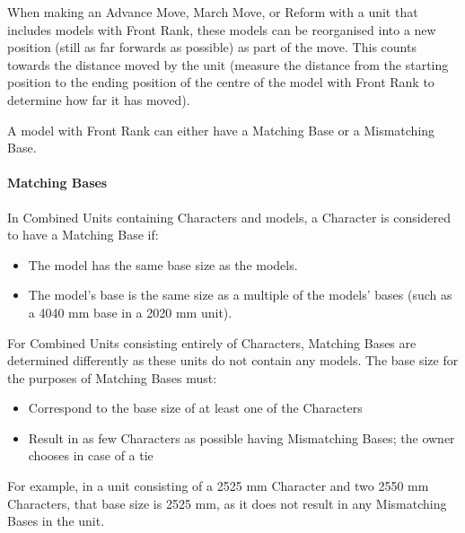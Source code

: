 When making an Advance Move, March Move, or Reform with a unit that includes models with Front Rank, these models can be reorganised into a new position (still as far forwards as possible) as part of the move. This counts towards the distance moved by the unit (measure the distance from the starting position to the ending position of the centre of the model with Front Rank to determine how far it has moved).

A model with Front Rank can either have a Matching Base or a Mismatching Base.

\paragraph{Matching Bases}
\label{matching_bases}

In Combined Units containing Characters and \rnf{} models, a Character is considered to have a Matching Base if:

\begin{itemize}
\item The model has the same base size as the \rnf{} models.
\item The model's base is the same size as a multiple of the \rnf{} models' bases (such as a \num{40}\timess{}\num{40} \si{\milli\meter} base in a \num{20}\timess{}\num{20} \si{\milli\meter} unit).
\end{itemize}

For Combined Units consisting entirely of Characters, Matching Bases are determined differently as these units do not contain any \rnf{} models. The \rnf{} base size for the purposes of Matching Bases must:
\begin{itemize}
\item Correspond to the base size of at least one of the Characters
\item Result in as few Characters as possible having Mismatching Bases; the owner chooses in case of a tie
\end{itemize}

For example, in a unit consisting of a 25\timess{}25 \si{\milli\meter} Character and two 25\timess{}50 \si{\milli\meter} Characters, that base size is 25\timess{}25 \si{\milli\meter}, as it does not result in any Mismatching Bases in the unit.

